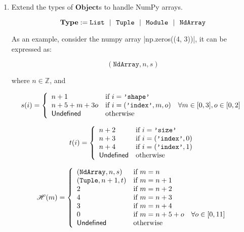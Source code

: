 \begin{enumerate}
\def\labelenumi{\arabic{enumi}.}
\item
  Extend the types of \(\mathbf{Object}\)s to handle NumPy arrays.

\[\mathbf{Type} := \texttt{List} ~~|~~ \texttt{Tuple} ~~|~~ \texttt{Module} ~~|~~ \texttt{NdArray}\]

  As an example, consider the numpy array \pycode|np.zeros((4, 3))|, it
  can be expressed as:

  \[\left(\texttt{NdArray}, n, s\right)\]

  where \(n \in \mathbb{Z}\), and

  \[s(i) = \left\{
    \begin{array}{ll}
      n + 1          & \text{if } i = \texttt{'shape'} \\
      n + 5 + m + 3o & \text{if } i = (\texttt{'index'}, m, o) \quad \forall m \in [0, 3], o \in [0, 2] \\
      \mathsf{Undefined}        & \text{otherwise} \\
    \end{array}
  \right.\]

  \[t(i) = \left\{
    \begin{array}{ll}
      n + 2   & \text{if } i = \texttt{'size'} \\
      n + 3   & \text{if } i = (\texttt{'index'}, 0) \\
      n + 4   & \text{if } i = (\texttt{'index'}, 1) \\
      \mathsf{Undefined} & \text{otherwise} \\
    \end{array}
  \right.\]

  \[\mathscr{H}(m) = \left\{
    \begin{array}{ll}
      (\texttt{NdArray}, n, s) & \text{if } m = n \\
      (\texttt{Tuple}, n+1, t) & \text{if } m = n + 1 \\
      2 & \text{if } m = n + 2 \\
      4 & \text{if } m = n + 3 \\
      3 & \text{if } m = n + 4 \\
      0 & \text{if } m = n + 5 + o \quad \forall o \in [0, 11] \\
      \mathsf{Undefined} & \text{otherwise} \\
    \end{array}
  \right.\]


\end{enumerate}
